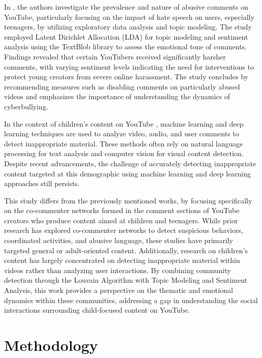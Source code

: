 \documentclass[sigconf]{acmart}
\begin{document}
In \cite{shekar2021}, the authors investigate the prevalence and nature of abusive comments on YouTube, 
particularly focusing on the impact of hate speech on users, especially teenagers, by utilizing 
exploratory data analysis and topic modeling. 
The study employed Latent Dirichlet Allocation (LDA) for topic modeling and sentiment analysis using 
the TextBlob library to assess the emotional tone of comments. Findings revealed that certain 
YouTubers received significantly harsher comments, with varying sentiment levels indicating the 
need for interventions to protect young creators from severe online harassment. 
The study concludes by recommending measures such as disabling comments on particularly abused 
videos and emphasizes the importance of understanding the dynamics of cyberbullying.

In the context of children's content on YouTube \cite{app13064044}, machine learning and deep learning 
techniques are used to analyze video, audio, and user comments to detect inappropriate 
material. These methods often rely on natural language processing for text analysis and computer 
vision for visual content detection. 
Despite recent advancements, the challenge of accurately detecting inappropriate content targeted at 
this demographic using machine learning and deep learning approaches still persists.

This study differs from the previously mentioned works, by focusing specifically on the co-commenter 
networks formed in the comment sections of YouTube creators who produce content aimed at children and teenagers. 
While prior research has explored co-commenter networks to detect suspicious behaviors, coordinated activities, 
and abusive language, these studies have primarily targeted general or adult-oriented content. 
Additionally, research on children's content has largely concentrated on detecting inappropriate 
material within videos rather than analyzing user interactions. By combining community detection 
through the Louvain Algorithm with Topic Modeling and Sentiment Analysis, this work provides a 
perspective on the thematic and emotional dynamics within these communities, 
addressing a gap in understanding the social interactions surrounding child-focused content on YouTube.

\section{Methodology}
\end{document}
